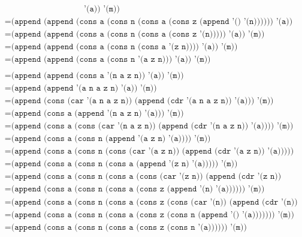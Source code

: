 \documentclass[letterpaper,11pt]{article}
\begin{document}
\begin{enumerate}
\begin{enumerate}
\begin{align*}
            & \; \; \; \; \; \; \; \; \; \; \; \; \; \; \; \; \; \; \; \; \; \; \;
            \; \; \; \; \; \; \; \; \; \; \; 
                                       \texttt{'(a)) '(m))} \\
            &= \texttt{(append (append (cons a (cons n (cons a (cons z (append '() '(n)))))) '(a)) '(m))} \\
            &= \texttt{(append (append (cons a (cons n (cons a (cons z '(n))))) '(a)) '(m))} \\
            &= \texttt{(append (append (cons a (cons n (cons a '(z n)))) '(a)) '(m))} \\
            &= \texttt{(append (append (cons a (cons n '(a z n))) '(a)) '(m))} \\
        \end{align*}
        \begin{align*}
            &= \texttt{(append (append (cons a '(n a z n)) '(a)) '(m))} \\
            &= \texttt{(append (append '(a n a z n) '(a)) '(m))} \\
            &= \texttt{(append (cons (car '(a n a z n)) (append (cdr '(a n a z n)) '(a))) '(m))} \\
            &= \texttt{(append (cons a (append '(n a z n) '(a))) '(m))} \\
            &= \texttt{(append (cons a (cons (car '(n a z n)) (append (cdr '(n a z n)) '(a)))) '(m))} \\
            &= \texttt{(append (cons a (cons n (append '(a z n) '(a)))) '(m))} \\
            &= \texttt{(append (cons a (cons n (cons (car '(a z n)) (append (cdr '(a z n)) '(a))))) '(m))} \\
            &= \texttt{(append (cons a (cons n (cons a (append '(z n) '(a))))) '(m))} \\
            &= \texttt{(append (cons a (cons n (cons a (cons (car '(z n)) (append (cdr '(z n)) '(a)))))) '(m))} \\
            &= \texttt{(append (cons a (cons n (cons a (cons z (append '(n) '(a)))))) '(m))} \\
            &= \texttt{(append (cons a (cons n (cons a (cons z (cons (car '(n)) (append (cdr '(n)) '(a))))))) (m))} \\
            &= \texttt{(append (cons a (cons n (cons a (cons z (cons n (append '() '(a))))))) '(m))} \\
            &= \texttt{(append (cons a (cons n (cons a (cons z (cons n '(a)))))) '(m))} \\

\end{align*}
\end{enumerate}
\end{enumerate}
\end{document}
